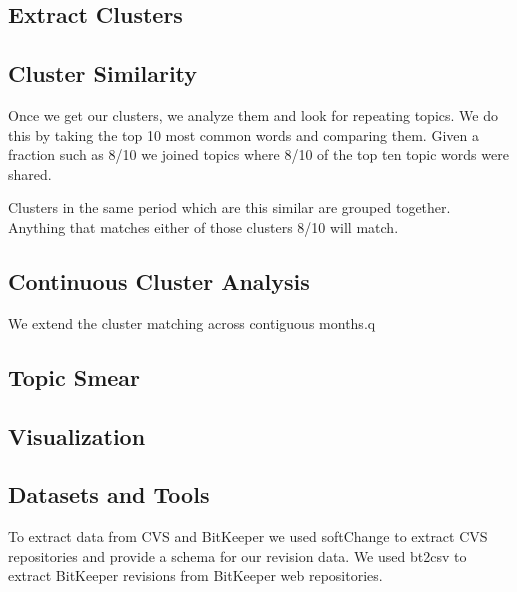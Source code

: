 \documentclass[times, 10pt,twocolumn]{article}
\begin{document}
\subsection{Extract Clusters}


\subsection{Cluster Similarity}


Once we get our clusters, we analyze them and look for repeating
topics. We do this by taking the top 10 most common words and
comparing them. Given a fraction such as 8/10 we joined topics where
8/10 of the top ten topic words were shared.

Clusters in the same period which are this similar are grouped
together. Anything that matches either of those clusters 8/10 will
match.



\subsection{Continuous Cluster Analysis}

We extend the cluster matching across contiguous months.q

\subsection{Topic Smear}
\subsection{Visualization}



\subsection{Datasets and Tools}

To extract data from CVS and BitKeeper we used softChange to extract
CVS repositories and provide a schema for our revision data. We used
bt2csv to extract BitKeeper revisions from BitKeeper web repositories.

\end{document}
